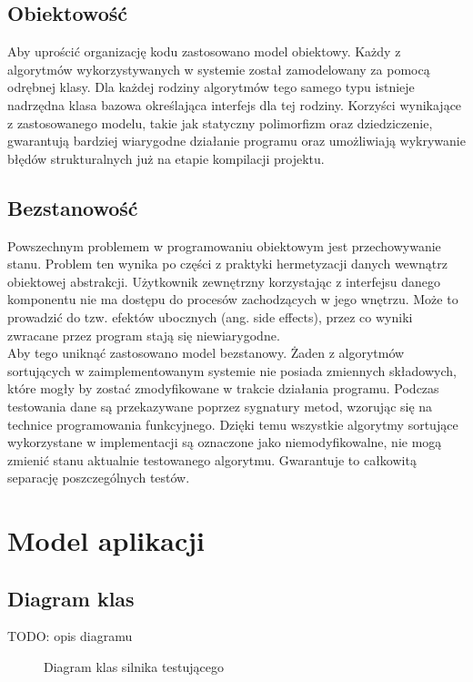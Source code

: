 \subsection{Obiektowość}
Aby uprościć organizację kodu zastosowano model obiektowy. Każdy z algorytmów wykorzystywanych w systemie
został zamodelowany za pomocą odrębnej klasy. Dla każdej rodziny algorytmów tego samego typu istnieje
nadrzędna klasa bazowa określająca interfejs dla tej rodziny. Korzyści wynikające z zastosowanego
modelu, takie jak statyczny polimorfizm oraz dziedziczenie, gwarantują bardziej wiarygodne działanie programu
oraz umożliwiają wykrywanie błędów strukturalnych już na etapie kompilacji projektu.

\subsection{Bezstanowość}
Powszechnym problemem w programowaniu obiektowym jest przechowywanie stanu. Problem ten wynika po części
z praktyki hermetyzacji danych wewnątrz obiektowej abstrakcji. Użytkownik zewnętrzny korzystając z interfejsu
danego komponentu nie ma dostępu do procesów zachodzących w jego wnętrzu. Może to prowadzić do tzw. efektów
ubocznych (ang. side effects), przez co wyniki zwracane przez program stają się niewiarygodne.\\

Aby tego uniknąć zastosowano model bezstanowy. Żaden z algorytmów sortujących w zaimplementowanym systemie
nie posiada zmiennych składowych, które mogły by zostać zmodyfikowane w trakcie działania programu. Podczas
testowania dane są przekazywane poprzez sygnatury metod, wzorując się na technice programowania funkcyjnego.
Dzięki temu wszystkie algorytmy sortujące wykorzystane w implementacji są oznaczone jako niemodyfikowalne,
nie mogą zmienić stanu aktualnie testowanego algorytmu. Gwarantuje to całkowitą separację poszczególnych testów.

\section{Model aplikacji}

\subsection{Diagram klas}
TODO: opis diagramu

\begin{figure}[H]
	\centering
	
	\caption{Diagram klas silnika testującego}
\end{figure}

